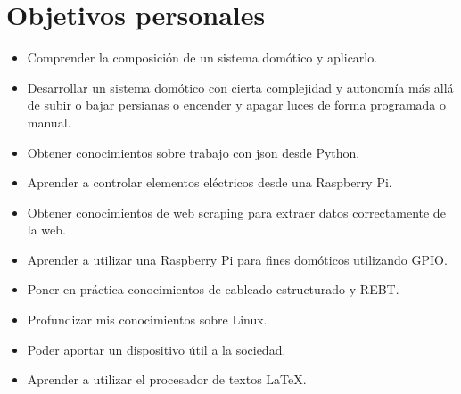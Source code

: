 \section{Objetivos personales}
\begin{itemize}
    \item Comprender la composición de un sistema domótico y aplicarlo.
    \item Desarrollar un sistema domótico con cierta complejidad y autonomía más allá de subir o bajar persianas o encender y apagar luces de forma programada o manual.
    \item Obtener conocimientos sobre trabajo con json desde Python.
    \item Aprender a controlar elementos eléctricos desde una Raspberry Pi.
    \item Obtener conocimientos de web scraping para extraer datos correctamente de la web.
    \item Aprender a utilizar una Raspberry Pi para fines domóticos utilizando GPIO.
    \item Poner en práctica conocimientos de cableado estructurado y REBT.
    \item Profundizar mis conocimientos sobre Linux.
    \item Poder aportar un dispositivo útil a la sociedad.
    \item Aprender a utilizar el procesador de textos \LaTeX.
\end{itemize}
